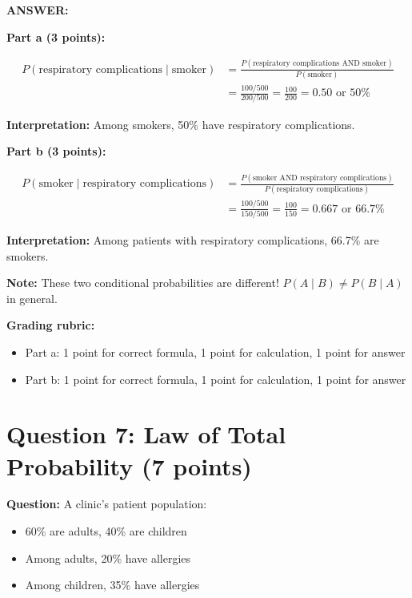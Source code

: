 \documentclass[11pt]{article}
\begin{document}
\textbf{ANSWER:}

\textbf{Part a (3 points):}

\begin{align*}
P(\text{respiratory complications} \mid \text{smoker}) &= \frac{P(\text{respiratory complications AND smoker})}{P(\text{smoker})}\\
&= \frac{100/500}{200/500} = \frac{100}{200} = 0.50 \text{ or } 50\%
\end{align*}

\textbf{Interpretation:} Among smokers, 50\% have respiratory complications.

\textbf{Part b (3 points):}

\begin{align*}
P(\text{smoker} \mid \text{respiratory complications}) &= \frac{P(\text{smoker AND respiratory complications})}{P(\text{respiratory complications})}\\
&= \frac{100/500}{150/500} = \frac{100}{150} = 0.667 \text{ or } 66.7\%
\end{align*}

\textbf{Interpretation:} Among patients with respiratory complications, 66.7\% are smokers.

\textbf{Note:} These two conditional probabilities are different! $P(A \mid B) \neq P(B \mid A)$ in general.

\textbf{Grading rubric:}
\begin{itemize}
    \item Part a: 1 point for correct formula, 1 point for calculation, 1 point for answer
    \item Part b: 1 point for correct formula, 1 point for calculation, 1 point for answer
\end{itemize}

\vspace{0.3cm}
\noindent\hrulefill

\section*{Question 7: Law of Total Probability (7 points)}

\textbf{Question:} A clinic's patient population:
\begin{itemize}
    \item 60\% are adults, 40\% are children
    \item Among adults, 20\% have allergies
    \item Among children, 35\% have allergies
\end{itemize}
\end{document}
